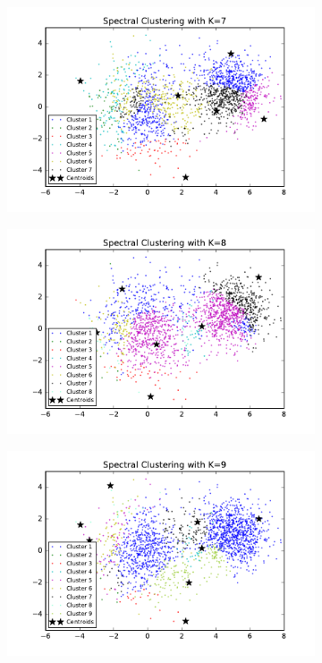 \begin{description}
\begin{description}
\begin{figure}[!h]
\begin{subfigure}[b]{0.475\textwidth}
            \includegraphics[width=\textwidth]{./figures/clustering_spectral_7.pdf}
        \end{subfigure}
        \hfill
        \begin{subfigure}[b]{0.475\textwidth}  
            \centering 
            \includegraphics[width=\textwidth]{./figures/clustering_spectral_8.pdf}
        \end{subfigure}
        \begin{subfigure}[b]{0.475\textwidth}   
            \centering 
            \includegraphics[width=\textwidth]{./figures/clustering_spectral_9.pdf}

\end{subfigure}
\end{figure}
\end{description}
\end{description}
